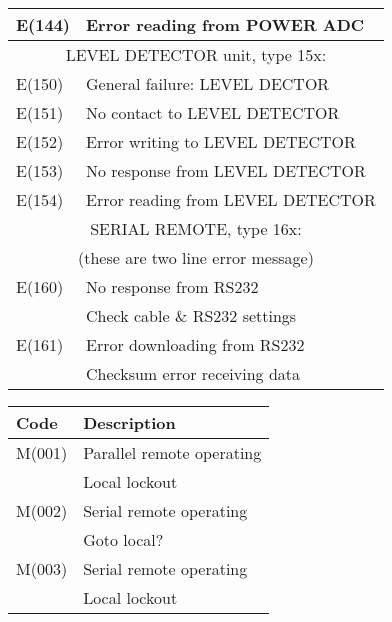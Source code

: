 \begin{longtable}{|l|l|}
E(144)& Error reading from POWER ADC\\ \hline
\multicolumn{2}{|c|}{LEVEL DETECTOR unit, type 15x:}\\ \hline
E(150)& General failure: LEVEL DECTOR\\ \hline
E(151)& No contact to LEVEL DETECTOR\\ \hline
E(152)& Error writing to LEVEL DETECTOR\\ \hline
E(153)& No response from LEVEL DETECTOR\\ \hline
E(154)& Error reading from LEVEL DETECTOR\\ \hline
\multicolumn{2}{|c|}{SERIAL REMOTE, type 16x:}\\
\multicolumn{2}{|c|}{(these are two line error message)}\\ \hline
E(160)& No response from RS232\\
&Check cable \& RS232 settings\\ \hline
E(161)& Error downloading from RS232\\
&Checksum error receiving data\\ \hline
\end{longtable}

\begin{tabular}{|l|l|}
\hline
Code 		& Description\\ \hline
M(001)	& Parallel remote operating\\
				& Local lockout\\ \hline
M(002)	& Serial remote operating\\
				& Goto local?\\ \hline
M(003)	& Serial remote operating\\
				& Local lockout\\ \hline
\end{tabular}
